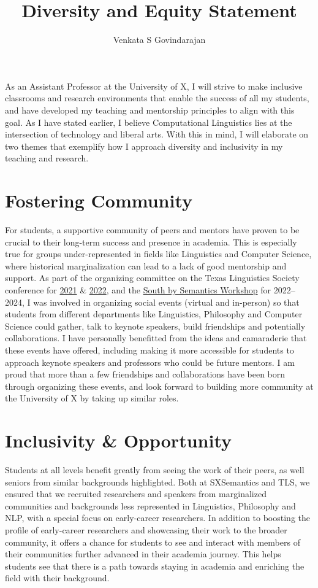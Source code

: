 \documentclass[11pt, letterpaper]{practical-report}
\title[]{Diversity and Equity Statement}
\author{Venkata S Govindarajan}
\date{}
\begin{document}
\maketitle
\thispagestyle{empty}

As an Assistant Professor at the University of X, I will strive to make inclusive classrooms and research environments that enable the success of all my students, and have developed my teaching and mentorship principles to align with this goal. As I have stated earlier, I believe Computational Linguistics lies at the intersection of technology and liberal arts. With this in mind, I will elaborate on two themes that exemplify how I approach diversity and inclusivity in my teaching and research.

\section*{Fostering Community}

For students, a supportive community of peers and mentors have proven to be crucial to their long-term success and presence in academia. This is especially true for groups under-represented in fields like Linguistics and Computer Science, where historical marginalization can lead to a lack of good mentorship and support. As part of the organizing committee on the Texas Linguistics Society conference for \href{http://tls.ling.utexas.edu/2021/}{2021} \& \href{http://tls.ling.utexas.edu/2022/}{2022}, and the \href{http://sites.utexas.edu/sxsemantics}{South by Semantics Workshop} for 2022--2024, I was involved in organizing social events (virtual and in-person) so that students from different departments like Linguistics, Philosophy and Computer Science could gather, talk to keynote speakers, build friendships and potentially collaborations. I have personally benefitted from the ideas and camaraderie that these events have offered, including making it more accessible for students to approach keynote speakers and professors who could be future mentors. I am proud that more than a few friendships and collaborations have been born through organizing these events, and look forward to building more community at the University of X by taking up similar roles. 

\section*{Inclusivity \& Opportunity}

Students at all levels benefit greatly from seeing the work of their peers, as well seniors from similar backgrounds highlighted. Both at SXSemantics and TLS, we ensured that we recruited researchers and speakers from marginalized communities and backgrounds less represented in Linguistics, Philosophy and NLP, with a special focus on early-career researchers. In addition to boosting the profile of early-career researchers and showcasing their work to the broader community, it offers a chance for students to see and interact with members of their communities further advanced in their academia journey. This helps students see that there is a path towards staying in academia and enriching the field with their background.
\end{document}
